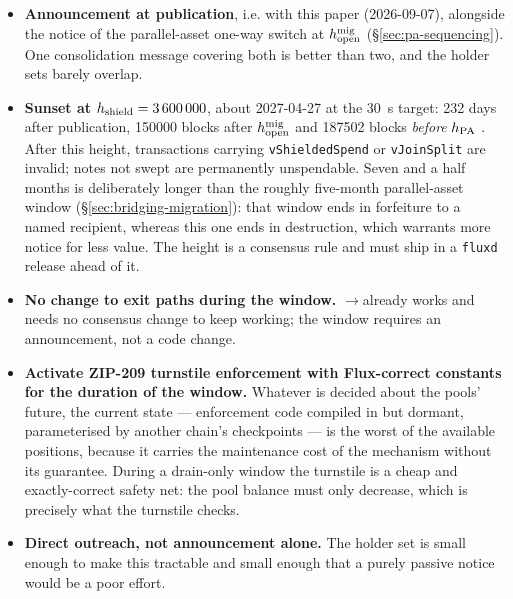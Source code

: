 \begin{itemize}
  \item \textbf{Announcement at publication}, i.e. with this paper (2026-09-07), alongside the notice
  of the parallel-asset one-way switch at $h^{\mathrm{mig}}_{\mathrm{open}}$ (\S\ref{sec:pa-sequencing}). One consolidation
  message covering both is better than two, and the holder sets barely overlap.
  \item \textbf{Sunset at $h_{\mathrm{shield}} = \num{3600000}$}, about 2027-04-27 at the \SI{30}{\second}
  target: \num{232} days after publication, \num{150000} blocks after $h^{\mathrm{mig}}_{\mathrm{open}}$ and \num{187502}
  blocks \emph{before} $h_{\mathrm{PA}}$ . After this height,
  transactions carrying \texttt{vShieldedSpend} or \texttt{vJoinSplit} are invalid; notes not swept
  are permanently unspendable. Seven and a half months is deliberately longer than the roughly
  five-month parallel-asset window (\S\ref{sec:bridging-migration}): that window ends in forfeiture
  to a named recipient, whereas this one ends in destruction, which warrants more notice for less
  value. The height is a consensus rule and must ship in a \texttt{fluxd} release ahead of it.
  \item \textbf{No change to exit paths during the window.} \zaddr${}\to{}$\taddr already works and
  needs no consensus change to keep working; the window requires an announcement, not a code change.
  \item \textbf{Activate ZIP-209 turnstile enforcement with Flux-correct constants for the duration
  of the window.} Whatever is decided about the pools' future, the current state --- enforcement
  code compiled in but dormant, parameterised by another chain's checkpoints --- is the worst of the
  available positions, because it carries the maintenance cost of the mechanism without its
  guarantee. During a drain-only window the turnstile is a cheap and exactly-correct safety net: the
  pool balance must only decrease, which is precisely what the turnstile checks.
  \item \textbf{Direct outreach, not announcement alone.} The holder set is small enough to make
  this tractable and small enough that a purely passive notice would be a poor effort.
\end{itemize}

